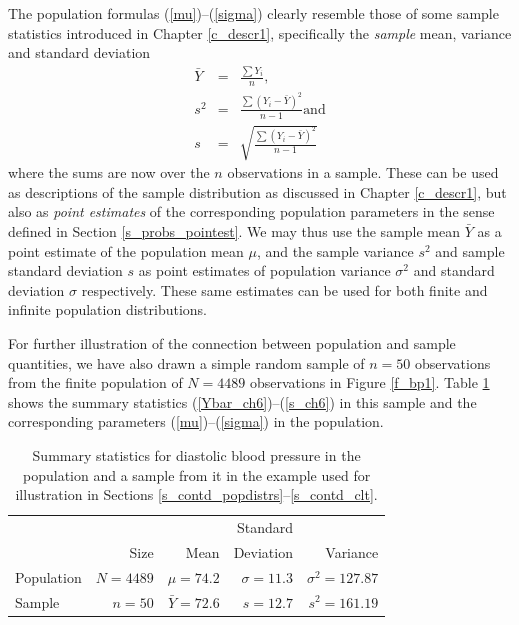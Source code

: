 The population formulas (\ref{mu})--(\ref{sigma}) clearly resemble those of
some sample statistics introduced in Chapter
\ref{c_descr1}, specifically the \emph{sample} mean, variance and
standard deviation
\begin{eqnarray}
\bar{Y}&=&\frac{\sum Y_{i}}{n}, \label{Ybar_ch6} \\
s^{2} &=& \frac{\sum (Y_{i}-\bar{Y})^{2}}{n-1} \text{and}
\label{s2_ch6} \\
s &=& \sqrt{\frac{\sum (Y_{i}-\bar{Y})^{2}}{n-1}}
\label{s_ch6}
\end{eqnarray}
where the sums are now over the $n$ observations in a sample. These can
be used as descriptions of the sample distribution as discussed in
Chapter \ref{c_descr1}, but also as \emph{point estimates} of the
corresponding population parameters in the sense defined in Section
\ref{s_probs_pointest}. We may thus use the sample mean $\bar{Y}$ as a
point estimate of the population mean $\mu$, and the sample variance
$s^{2}$ and sample standard deviation $s$ as point estimates of
population variance $\sigma^{2}$ and standard deviation $\sigma$
respectively. These same estimates can be used for both finite and
infinite population distributions.

For further illustration of the connection between population and
sample quantities, we have also drawn a simple random sample of $n=50$
observations from the finite population of $N=4489$ observations in
Figure \ref{f_bp1}. Table \ref{t_bp_example} shows the summary
statistics (\ref{Ybar_ch6})--(\ref{s_ch6}) in this sample and the
corresponding parameters (\ref{mu})--(\ref{sigma}) in the population.

\begin{table}
\caption{Summary statistics for diastolic blood pressure in the
population and a sample from it in the example used for illustration
in Sections \ref{s_contd_popdistrs}--\ref{s_contd_clt}.}
\label{t_bp_example}
\begin{center}
\begin{tabular}{|l|rrrr|}\hline
& & & Standard & \\
& Size & Mean & Deviation & Variance \\ \hline
Population

& $N=4489$ & $\mu=74.2$ & $\sigma=11.3$ &
$\sigma^{2}=127.87$ \\ \hline
Sample

& $n=50$ & $\bar{Y}=72.6$ & $s=12.7$ & $s^{2}=161.19$ \\
\hline
\end{tabular}
\end{center}
\end{table}

